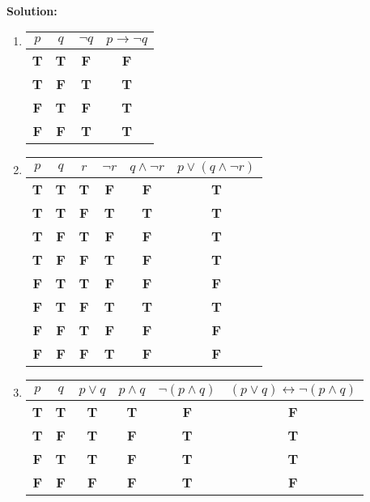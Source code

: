\documentclass{article}
\newenvironment{solution} {
    \par
    \color{blue}
    \vspace{2mm}
    \hline \\
    \textbf{Solution:}
} {
    \vspace{2mm}
    \newpage
}
\newcommand{\T}{\color{black} \textbf{T}}
\newcommand{\F}{\color{red} \textbf{F}}
\begin{document}
\begin{enumerate}
    \begin{solution}
    \begin{enumerate}
        \item \begin{tabular}{c|c|c|c}
            $p$ & $q$ & $\neg q$ & $p \rightarrow \neg q$\\
            \hline
            \T & \T & \F & \F \\
            \T & \F & \T & \T \\
            \F & \T & \F & \T\\
            \F & \F & \T & \T\\
        \end{tabular}
        \item \begin{tabular}{c|c|c|c|c|c}
            $p$ & $q$ & $r$ & $\neg r$ & $q \land \neg r$ & $p \lor (q \land \neg r)$\\
            \hline
            \T & \T & \T & \F & \F & \T\\
            \T & \T & \F & \T & \T & \T\\
            \T & \F & \T & \F & \F & \T\\
            \T & \F & \F & \T & \F & \T\\
            \F & \T & \T & \F & \F & \F\\
            \F & \T & \F & \T & \T & \T\\
            \F & \F & \T & \F & \F & \F\\
            \F & \F & \F & \T & \F & \F\\
        \end{tabular}
        \item \begin{tabular}{c|c|c|c|c|c}
            $p$ & $q$ & $p \lor q$ & $p \land q$ &$\neg (p \land q)$ &$(p \lor q) \leftrightarrow \lnot (p \land q)$\\
            \hline
            \T & \T & \T & \T & \F & \F\\
            \T & \F & \T & \F & \T & \T\\
            \F & \T & \T & \F & \T & \T\\
            \F & \F & \F & \F & \T & \F\\
        \end{tabular}
    \end{enumerate}

    
    \end{solution}
    

\end{enumerate}
\end{document}
